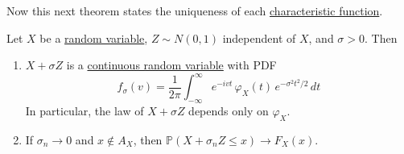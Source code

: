 	Now this next theorem states the uniqueness of each \hyperref[def:characteristic-function]{characteristic function}. 

	\begin{lemma}
	  \label{thm:gaussian-smoothing}
		Let $X$ be a \hyperref[def:random-variable]{random variable}, $Z \sim N(0, 1)$ independent of $X$, and $\sigma > 0$. Then 
		\begin{enumerate}
			\item $X + \sigma Z$ is a \hyperref[def:continuous-random-variable]{continuous random variable} with PDF 
			\begin{equation}
				f_\sigma (v) = \frac{1}{2 \pi} \int_{-\infty}^\infty e^{-i v t} \, \varphi_X (t) \, e^{-\sigma^2 t^2 / 2} \,dt
			\end{equation}
			In particular, the law of $X + \sigma Z$ depends only on $\varphi_X$. 
			\item If $\sigma_n \to 0$ and $x \notin A_X$, then $\mathbb{P}(X + \sigma_n Z \leq x) \to F_X (x)$. 
		\end{enumerate}
	\end{lemma}
